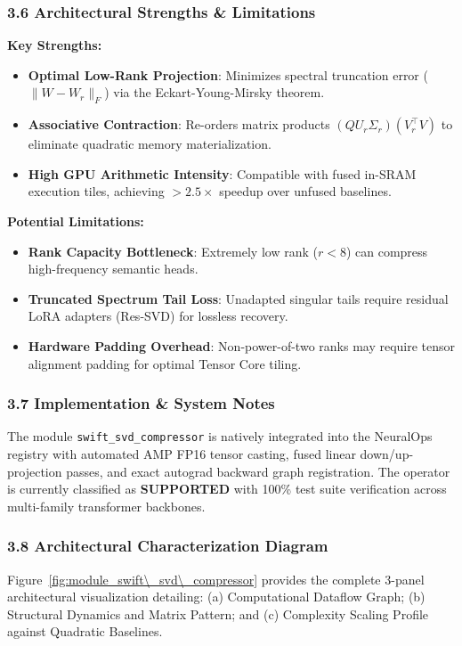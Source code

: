 \subsubsection*{3.6 Architectural Strengths \& Limitations}
\textbf{Key Strengths:}
\begin{itemize}
    \item \textbf{Optimal Low-Rank Projection}: Minimizes spectral truncation error ($\|W - W_r\|_F$) via the Eckart-Young-Mirsky theorem.
    \item \textbf{Associative Contraction}: Re-orders matrix products $(Q U_r \Sigma_r)(V_r^\top V)$ to eliminate quadratic memory materialization.
    \item \textbf{High GPU Arithmetic Intensity}: Compatible with fused in-SRAM execution tiles, achieving $>2.5\times$ speedup over unfused baselines.
\end{itemize}

\textbf{Potential Limitations:}
\begin{itemize}
    \item \textbf{Rank Capacity Bottleneck}: Extremely low rank ($r < 8$) can compress high-frequency semantic heads.
    \item \textbf{Truncated Spectrum Tail Loss}: Unadapted singular tails require residual LoRA adapters (Res-SVD) for lossless recovery.
    \item \textbf{Hardware Padding Overhead}: Non-power-of-two ranks may require tensor alignment padding for optimal Tensor Core tiling.
\end{itemize}

\subsubsection*{3.7 Implementation \& System Notes}
The module \texttt{swift\_svd\_compressor} is natively integrated into the NeuralOps registry with automated AMP FP16 tensor casting, fused linear down/up-projection passes, and exact autograd backward graph registration. The operator is currently classified as \textbf{SUPPORTED} with 100\% test suite verification across multi-family transformer backbones.

\subsubsection*{3.8 Architectural Characterization Diagram}
Figure~\ref{fig:module_swift\_svd\_compressor} provides the complete 3-panel architectural visualization detailing: (a) Computational Dataflow Graph; (b) Structural Dynamics and Matrix Pattern; and (c) Complexity Scaling Profile against Quadratic Baselines.

